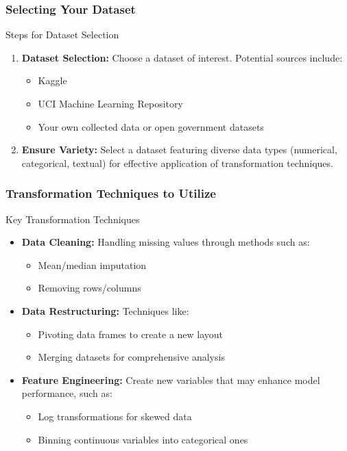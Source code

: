 \documentclass[aspectratio=169]{beamer}
\begin{document}
\begin{frame}[fragile]
    \frametitle{Selecting Your Dataset}
    \begin{block}{Steps for Dataset Selection}
        \begin{enumerate}
            \item \textbf{Dataset Selection:}
                Choose a dataset of interest. Potential sources include:
                \begin{itemize}
                    \item Kaggle
                    \item UCI Machine Learning Repository
                    \item Your own collected data or open government datasets
                \end{itemize}

            \item \textbf{Ensure Variety:} 
                Select a dataset featuring diverse data types (numerical, categorical, textual) for effective application of transformation techniques.
        \end{enumerate}
    \end{block}
\end{frame}

\begin{frame}[fragile]
    \frametitle{Transformation Techniques to Utilize}
    \begin{block}{Key Transformation Techniques}
        \begin{itemize}
            \item \textbf{Data Cleaning:} Handling missing values through methods such as:
            \begin{itemize}
                \item Mean/median imputation
                \item Removing rows/columns
            \end{itemize}

            \item \textbf{Data Restructuring:} Techniques like:
            \begin{itemize}
                \item Pivoting data frames to create a new layout
                \item Merging datasets for comprehensive analysis
            \end{itemize}

            \item \textbf{Feature Engineering:} Create new variables that may enhance model performance, such as:
            \begin{itemize}
                \item Log transformations for skewed data
                \item Binning continuous variables into categorical ones
            \end{itemize}
        \end{itemize}
    \end{block}
\end{frame}
\end{document}
